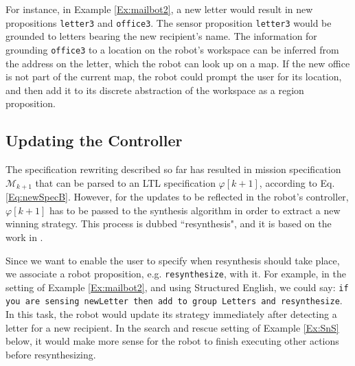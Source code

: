 For instance, in Example \ref{Ex:mailbot2}, a new letter would result in new propositions \texttt{letter3} and \texttt{office3}. The sensor proposition \texttt{letter3} would be grounded to letters bearing the new recipient's name. The information for grounding \texttt{office3} to a location on the robot's workspace can be inferred from the address on the letter, which the robot can look up on a map. If the new office is not part of the current map, the robot could prompt the user for its location, and then add it to its discrete abstraction of the workspace as a region proposition.

\subsection{Updating the Controller}

The specification rewriting described so far has resulted in mission specification $\mathcal{M}_{k+1}$ that can be parsed to an LTL specification $\varphi [k+1]$, according to Eq. \eqref{Eq:newSpecB}. However, for the updates to be reflected in the robot's controller, $\varphi [k+1]$ has to be passed to the synthesis algorithm in order to extract a new winning strategy. This process is dubbed ``resynthesis", and it is based on the work in \cite{BingxinRSS2012}.

Since we want to enable the user to specify when resynthesis should take place,
we associate a robot proposition, e.g. \texttt{resynthesize}, with it. 
For example, in the setting of Example \ref{Ex:mailbot2}, and using Structured English, we could say:
\texttt{if you are sensing newLetter then add to group Letters and resynthesize}. 
In this task, the robot would update its strategy immediately after detecting a letter for a new recipient. In the search and rescue setting of Example \ref{Ex:SnS} below, it would make more sense for the robot to finish executing other actions before resynthesizing.

